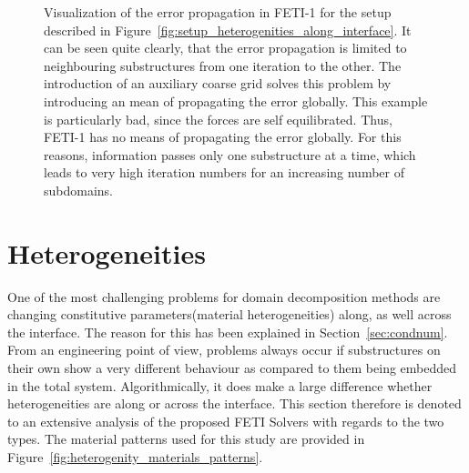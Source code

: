 \begin{figure}[tb]
  \begin{center}
    
    \caption[Limited error propagation FETI-1]{Visualization of the error propagation in FETI-1 for the setup described in Figure~\ref{fig:setup_heterogenities_along_interface}. It can be seen quite clearly, that the error propagation is limited to neighbouring substructures from one iteration to the other. The introduction of an auxiliary coarse grid solves this problem by introducing an mean of propagating the error globally. This example is particularly bad, since the forces are self equilibrated. Thus, FETI-1 has no means of propagating the error globally. For this reasons, information passes only one substructure at a time, which leads to very high iteration numbers for an increasing number of subdomains. }
    \label{fig:beam_error_propagation}
  \end{center}
\end{figure}

\section{Heterogeneities}\label{sec:heterogeneities}
One of the most challenging problems for domain decomposition methods are changing constitutive parameters(material heterogeneities) along, as well across the interface. The reason for this has been explained in Section~\ref{sec:condnum}.\\
From an engineering point of view, problems always occur if substructures on their own show a very different behaviour as compared to them being embedded in the total system. Algorithmically, it does make a large difference whether heterogeneities are along or across the interface. This section therefore is denoted to an extensive analysis of the proposed FETI Solvers with regards to the two types. The material patterns used for this study are provided in Figure~\ref{fig:heterogenity_materials_patterns}.


